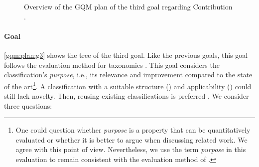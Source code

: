 \newcommand{\textGiii}[0]{Validate the classification's \emph{purpose}, i.e., the classification's quality and relevance in comparison to existing classifications and taxonomies.}
\newcommand{\textGiiiQi}[0]{Is the classification \emph{relevant}, comprising only necessary categories?}
\newcommand{\textGiiiQii}[0]{Is the classification \emph{novel}, having the right degree of new categories?}
\newcommand{\textGiiiQiii}[0]{Is the classification \emph{significant}, enabling a more precise description?}
\newcommand{\textGiiiQiMi}[0]{Fraction of relevant classes and categories}
\newcommand{\textGiiiQiiMi}[0]{\emph{innovation}(C,\mathcal{T}) = \frac{\sum\nolimits_{c\in C} \min_{T\in\mathcal{T}} new(C,T,c) }{\lvert C \rvert} \in [0,1]}
\newcommand{\textGiiiQiiMii}[0]{\emph{adaptation}(C,\mathcal{T}) = \frac{\sum\nolimits_{c\in C} \max_{T\in\mathcal{T}} adapted(C,T,c) }{\lvert C \rvert} \in [0,1]}
\newcommand{\textGiiiQiiiMi}[0]{\emph{classificationDelta}(C,\mathcal{T},\mathcal{R}) = \frac{\lvert\sim_C\rvert - (\max_{T\in \mathcal{T}} \lvert\sim_T\rvert)}{\lvert\mathcal{R}\rvert} \in [-1,1]}
\begin{figure}
    \centering
    \caption{Overview of the \ac*{GQM} plan of the third goal regarding Contribution .}
    \label{gqm:plan:g3}
\end{figure}

\paragraph{Goal }\label{gqm:text:g:3}
\autoref{gqm:plan:g3} shows the tree of the third goal.
Like the previous goals, this goal follows the evaluation method for taxonomies \cite{kaplan_introducing_2022}.
This goal considers the classification's \emph{purpose}, i.e., its relevance and improvement compared to the state of the art\footnote{One could question whether \emph{purpose} is a property that can be quantitatively evaluated or whether it is better to argue when discussing related work. We agree with this point of view. Nevertheless, we use the term \emph{purpose} in this evaluation to remain consistent with the evaluation method of \textcite{kaplan_introducing_2022}.}.
A classification with a suitable structure () and applicability () could still lack novelty.
Then, reusing existing classifications is preferred \cite{kaplan_introducing_2022}.
We consider three questions:

